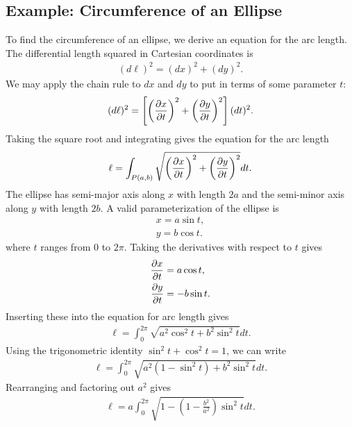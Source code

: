 \subsection{Example: Circumference of an Ellipse}

To find the circumference of an ellipse, we derive an equation for the arc length. The differential length squared in Cartesian coordinates is
\begin{align}
  ( d\ell )^2 = (dx)^2 + (dy)^2.
\end{align}
We may apply the chain rule to $dx$ and $dy$ to put in terms of some parameter $t$:
\begin{align}
  ( d\ell )^2 = \left[ \left( \frac{ \partial {x} }{ \partial {t} } \right)^2 + \left(\frac{ \partial {y} }{ \partial {t} } \right)^2 \right] (dt)^2 .
\end{align}
Taking the square root and integrating gives the equation for the arc length
\begin{align}
  \ell = \int_{P(a,b)} \sqrt{ \left( \frac{ \partial {x} }{ \partial {t} } \right)^2 + \left(\frac{ \partial {y} }{ \partial {t} } \right)^2 } dt .
\end{align}
The ellipse has semi-major axis along $x$ with length $2a$ and the semi-minor axis along $y$ with length $2b$. A valid parameterization of the ellipse is
\begin{subequations}
\begin{align}
  x = a \sin t , \\
  y = b \cos t .
\end{align}
\end{subequations}
where $t$ ranges from 0 to $2\pi$. Taking the derivatives with respect to $t$ gives
\begin{subequations}
\begin{align}
  \frac{ \partial {x} }{ \partial {t} } &=  a \cos t , \\
  \frac{ \partial {y} }{ \partial {t} } &= -b \sin t .
\end{align}
\end{subequations}
Inserting these into the equation for arc length gives
\begin{align}
  \ell = \int_0^{2\pi} \sqrt{ a^2 \cos^2 t + b^2 \sin^2 t } dt .
\end{align}
Using the trigonometric identity $\sin^2t + \cos^2t = 1$, we can write
\begin{align}
  \ell = \int_0^{2\pi} \sqrt{ a^2 (1 - \sin^2 t) + b^2 \sin^2 t } dt . \nonumber
\end{align}
Rearranging and factoring out $a^2$ gives
\begin{align}
  \ell = a \int_0^{2\pi}  \sqrt{ 1 - \left( 1 - \frac{b^2}{a^2}  \right) \sin^2 t } dt . \nonumber
\end{align}
